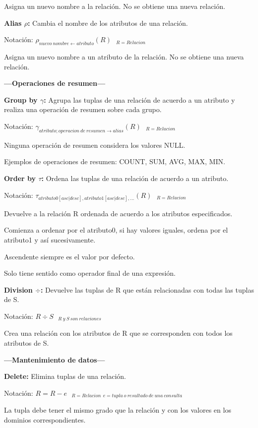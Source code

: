 \documentclass{article}
\begin{document}
Asigna un nuevo nombre a la relación. No se obtiene una nueva relación.

\textbf{Alias $\rho$:} Cambia el nombre de los atributos de una relación.

Notación: $\rho _{nuevo\ nombre\leftarrow atributo} (R)\ \ \ _{R=Relacion}$

Asigna un nuevo nombre a un atributo de la relación. No se obtiene una nueva relación.

\vspace{5mm}
\centerline{\textbf{---Operaciones de resumen---}}

\textbf{Group by $\gamma$:} Agrupa las tuplas de una relación de acuerdo a un atributo y realiza una operación de resumen sobre cada grupo.

Notación: $\gamma _{atributo; operacion\ de\ resumen\rightarrow alias}(R)\ \ \ _{R=Relacion}$

Ninguna operación de resumen considera los valores NULL.

Ejemplos de operaciones de resumen: COUNT, SUM, AVG, MAX, MIN.

\textbf{Order by $\tau$:} Ordena las tuplas de una relación de acuerdo a un atributo.

Notación: $\tau _{atributo0[asc|desc],atributo1[asc|desc],...}(R)\ \ \ _{R=Relacion}$

Devuelve a la relación R ordenada de acuerdo a los atributos especificados.

Comienza a ordenar por el atributo0, si hay valores iguales, ordena por el atributo1 y así sucesivamente.

Ascendente siempre es el valor por defecto.

Solo tiene sentido como operador final de una expresión.

\textbf{Division $\div$:} Devuelve las tuplas de R que están relacionadas con todas las tuplas de S.

Notación: $R\div S\ \ \ _{R\ y\ S\ son\ relaciones}$

Crea una relación con los atributos de R que se corresponden con todos los atributos de S.

\vspace{5mm}
\centerline{\textbf{---Mantenimiento de datos---}}

\textbf{Delete:} Elimina tuplas de una relación.

Notación: $R=R-e \ \ \ _{R=Relacion\ \ e=tupla\ o\ resultado\ de\ una\ consulta}$

La tupla debe tener el mismo grado que la relación y con los valores en los dominios correspondientes.
\end{document}
